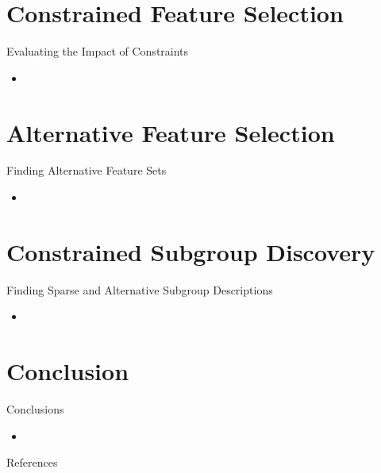 \documentclass[en, navbarinline, handout]{sdqbeamer}
\begin{document}
\section{Constrained Feature Selection}

\begin{frame}[t]{Evaluating the Impact of Constraints}
	\begin{itemize}
		\item
	\end{itemize}
\end{frame}

\section{Alternative Feature Selection}

\begin{frame}[t]{Finding Alternative Feature Sets}
	\begin{itemize}
		\item
	\end{itemize}
\end{frame}

\section{Constrained Subgroup Discovery}

\begin{frame}[t]{Finding Sparse and Alternative Subgroup Descriptions}
	\begin{itemize}
		\item
	\end{itemize}
\end{frame}

\section{Conclusion}

\begin{frame}[t]{Conclusions}
	\begin{itemize}
		\item
	\end{itemize}
\end{frame}

\appendix
\beginbackup %

\begin{frame}[t, allowframebreaks]{References}
	\printbibliography
\end{frame}
\end{document}
